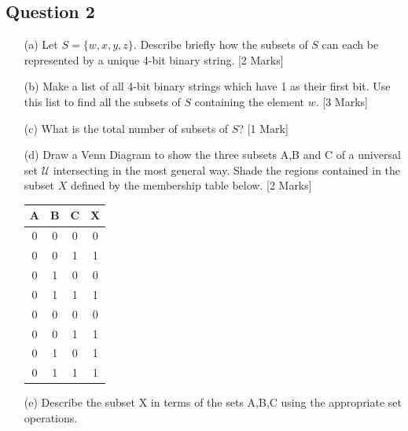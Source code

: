 \documentclass[a4paper,12pt]{article}
\begin{document}
\subsection*{Question 2}
\begin{itemize}
\item[(a)] Let $S= \{w,x,y,z\}$. Describe briefly how the subsets of $S$ can each be represented by a unique 4-bit binary string. [2 Marks]
\item[(b)] Make a list of all 4-bit binary strings which have 1 as their first bit. Use this list to find all the subsets of $S$ containing the element $w$. [3 Marks]
\item[(c)] What is the total number of subsets of $S$? [1 Mark]
\item[(d)] Draw a Venn Diagram to show the three subsets A,B and C of a universal set $\mathcal{U}$
intersecting in the most general way. Shade the regions contained in the subset $X$ defined
by the membership table below. [2 Marks]\\ 
\begin{center}
\begin{tabular}{|ccc|c|}
  \hline
  A & B & C & X \\\hline
  0 & 0 & 0 & 0 \\
  0 & 0 & 1 & 1 \\
  0 & 1 & 0 & 0 \\
  0 & 1 & 1 & 1 \\
  0 & 0 & 0 & 0 \\
  0 & 0 & 1 & 1 \\
  0 & 1 & 0 & 1 \\
  0 & 1 & 1 & 1 \\
  \hline
\end{tabular}
\end{center}
\item[(e)] Describe the subset X in terms of the sets A,B,C using the appropriate set operations. \newline [2 Marks]
\end{itemize}
\newpage
\end{document}
